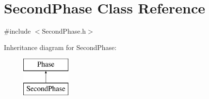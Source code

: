 \hypertarget{class_second_phase}{}\section{Second\+Phase Class Reference}
\label{class_second_phase}


{\ttfamily \#include $<$Second\+Phase.\+h$>$}

Inheritance diagram for Second\+Phase\+:\begin{figure}[H]
\begin{center}
\leavevmode
\includegraphics[height=2.000000cm]{class_second_phase}
\end{center}
\end{figure}

